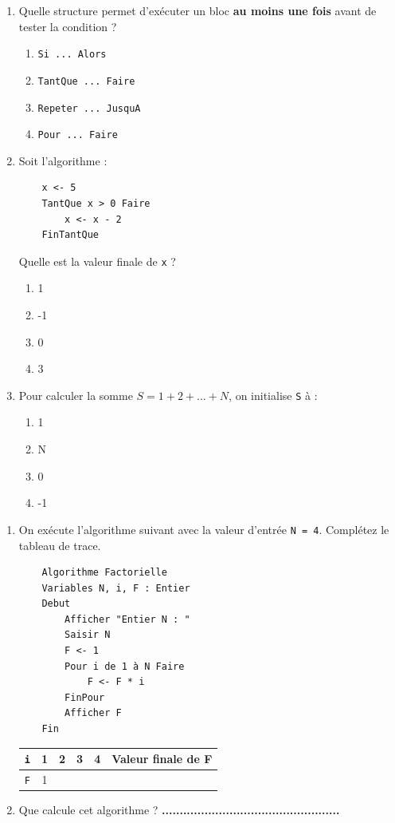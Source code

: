 \documentclass[11pt]{article}
\begin{document}
\begin{exercice}
\begin{enumerate}
    \item Quelle structure permet d'exécuter un bloc \textbf{au moins une fois} avant de tester la condition ?
    \begin{enumerate}
        \item \texttt{Si ... Alors}
        \item \texttt{TantQue ... Faire}
        \item \texttt{Repeter ... JusquA}
        \item \texttt{Pour ... Faire}
    \end{enumerate}
    \item Soit l'algorithme :
    \begin{verbatim}
    x <- 5
    TantQue x > 0 Faire
        x <- x - 2
    FinTantQue
    \end{verbatim}
    Quelle est la valeur finale de \texttt{x} ?
    \begin{enumerate}
        \item 1
        \item -1
        \item 0
        \item 3
    \end{enumerate}
    \item Pour calculer la somme $S = 1 + 2 + \dots + N$, on initialise \texttt{S} à :
    \begin{enumerate}
        \item 1
        \item N
        \item 0
        \item -1
    \end{enumerate}
\end{enumerate}
\end{exercice}

\begin{exercice}
\begin{enumerate}
    \item On exécute l'algorithme suivant avec la valeur d'entrée \texttt{N = 4}. Complétez le tableau de trace.
    \begin{verbatim}
    Algorithme Factorielle
    Variables N, i, F : Entier
    Debut
        Afficher "Entier N : "
        Saisir N
        F <- 1
        Pour i de 1 à N Faire
            F <- F * i
        FinPour
        Afficher F
    Fin
    \end{verbatim}
    \begin{tabular}{|c|c|c|c|c|c|}
    \hline
    \texttt{i} & 1 & 2 & 3 & 4 & \textbf{Valeur finale de F} \\
    \hline
    \texttt{F} & 1 &   &   &   & \\
    \hline
    \end{tabular}
    \item Que calcule cet algorithme ? \hfill \textbf{..................................................}
\end{enumerate}
\end{exercice}
\end{document}
